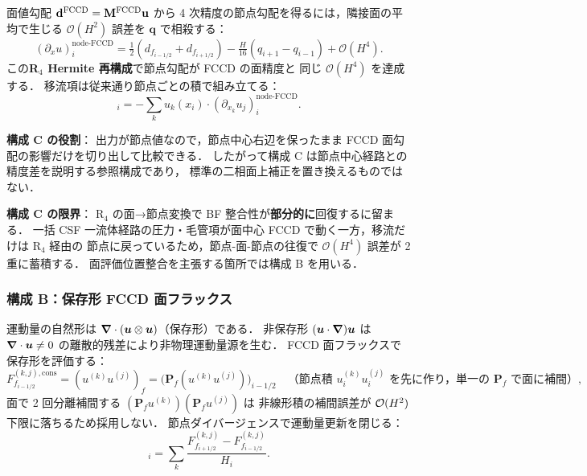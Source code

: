 面値勾配 $\mathbf{d}^{\mathrm{FCCD}} = \mathbf{M}^{\mathrm{FCCD}}\mathbf{u}$ から
4 次精度の節点勾配を得るには，隣接面の平均で生じる
$\mathcal{O}(H^2)$ 誤差を $\mathbf{q}$ で相殺する：
\begin{equation}
  (\partial_x u)^{\text{node-FCCD}}_i
  = \tfrac{1}{2}(d_{f_{i-1/2}} + d_{f_{i+1/2}})
  - \tfrac{H}{16}(q_{i+1} - q_{i-1})
  + \mathcal{O}(H^4).
  \label{eq:fccd_adv_R4}
\end{equation}
この\textbf{R$_4$ Hermite 再構成}で節点勾配が FCCD の面精度と
同じ $\mathcal{O}(H^4)$ を達成する．
移流項は従来通り節点ごとの積で組み立てる：
\begin{equation}
  [\mathcal{A}^{(j)}]_i = -\sum_k u_k(x_i)\cdot(\partial_{x_k} u_j)^{\text{node-FCCD}}_i.
  \label{eq:fccd_adv_option_c}
\end{equation}

\noindent\textbf{構成 C の役割}：
出力が節点値なので，節点中心右辺を保ったまま
FCCD 面勾配の影響だけを切り出して比較できる．
したがって構成 C は節点中心経路との精度差を説明する参照構成であり，
標準の二相面上補正を置き換えるものではない．

\noindent\textbf{構成 C の限界}：
R$_4$ の面→節点変換で BF 整合性が\textbf{部分的に}回復するに留まる．
一括 CSF 一流体経路の圧力・毛管項が面中心 FCCD で動く一方，移流だけは R$_4$ 経由の
節点に戻っているため，節点-面-節点の往復で
$\mathcal{O}(H^4)$ 誤差が 2 重に蓄積する．
面評価位置整合を主張する箇所では構成 B を用いる．

\subsubsection{構成 B：保存形 FCCD 面フラックス}
\label{sec:fccd_adv_option_b}

運動量の自然形は $\bm{\nabla}\cdot(\bm{u}\otimes\bm{u})$（保存形）である．
非保存形 $(\bm{u}\cdot\bm{\nabla})\bm{u}$ は $\bm{\nabla}\cdot\bm{u}\neq 0$
の離散的残差により非物理運動量源を生む．
FCCD 面フラックスで保存形を評価する：
\begin{equation}
  F^{(k,j),\text{cons}}_{f_{i-1/2}}
  = (u^{(k)} u^{(j)})_f
  = \bigl(\mathbf{P}_f(u^{(k)} u^{(j)})\bigr)_{i-1/2}
  \quad\text{（節点積 $u^{(k)}_i u^{(j)}_i$ を先に作り，単一の $\mathbf{P}_f$ で面に補間）},
  \label{eq:fccd_adv_flux_cons}
\end{equation}
面で 2 回分離補間する $(\mathbf{P}_f u^{(k)})(\mathbf{P}_f u^{(j)})$ は
非線形積の補間誤差が $\mathcal{O}(H^2)$ 下限に落ちるため採用しない．
節点ダイバージェンスで運動量更新を閉じる：
\begin{equation}
  [\bnabla\cdot F^{(j)}]_i
  = \sum_k\frac{F^{(k,j)}_{f_{i+1/2}} - F^{(k,j)}_{f_{i-1/2}}}{H_i}.
  \label{eq:fccd_adv_divergence}
\end{equation}

